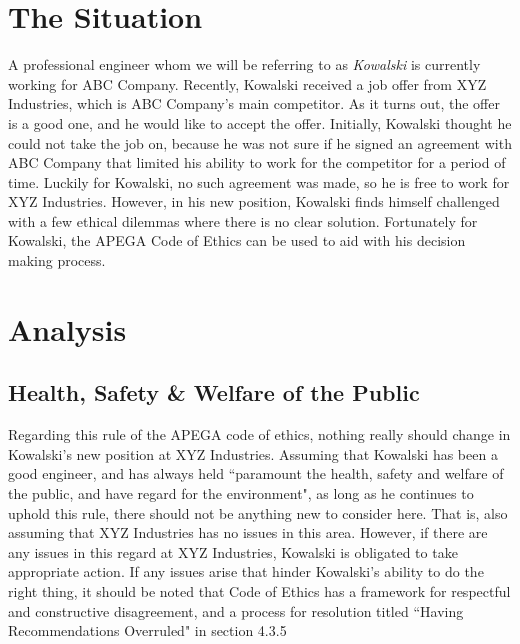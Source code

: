 \documentclass[letterpaper,12pt]{article}
\begin{document}
\section{The Situation}
A professional engineer whom we will be referring to as \textit{Kowalski} is currently working for ABC Company.
Recently, Kowalski received a job offer from XYZ Industries, which is ABC Company's main competitor. As it turns out,
the offer is a good one, and he would like to accept the offer. Initially, Kowalski thought he could not take 
the job on, because he was not sure if he signed an agreement with ABC Company that limited his ability to work for the
competitor for a period of time. Luckily for Kowalski, no such agreement was made, so he is free to work for XYZ Industries.
However, in his new position, Kowalski finds himself challenged with a few ethical dilemmas where there is no clear solution.
Fortunately for Kowalski, the APEGA Code of Ethics can be used to aid with his decision making process. 


\section{Analysis}

\subsection{Health, Safety \& Welfare of the Public}
Regarding this rule of the APEGA code of ethics, nothing really should change in Kowalski's new position at XYZ Industries.
Assuming that Kowalski has been a good engineer, and has always held ``paramount the health, safety and welfare of the public, and have regard for the
environment"\cite{apegacode}, as long as he continues to uphold this rule, there should not be anything new to consider here. That is,
also assuming that XYZ Industries has no issues in this area. However, if there are any issues in this regard at XYZ Industries, Kowalski is obligated to take appropriate action.
If any issues arise that hinder Kowalski's ability to do the right thing, it should be noted that Code of Ethics has a framework for respectful and constructive disagreement, and a process for
resolution titled ``Having Recommendations Overruled" in section 4.3.5
\end{document}
